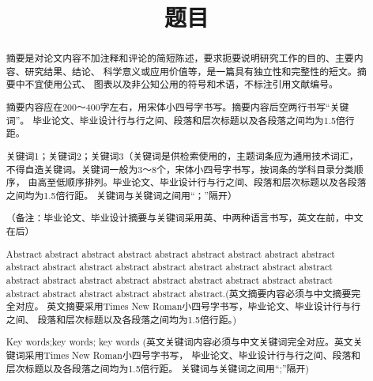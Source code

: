 \documentclass{sicnuthesis}
\title{题目}
\author{}
\date{}
\begin{document}
\maketitle

\newpage

\begin{abstract}


摘要是对论文内容不加注释和评论的简短陈述，要求扼要说明研究工作的目的、主要内容、研究结果、结论、
科学意义或应用价值等，是一篇具有独立性和完整性的短文。摘要中不宜使用公式、
图表以及非公知公用的符号和术语，不标注引用文献编号。

摘要内容应在200～400字左右，用宋体小四号字书写。摘要内容后空两行书写“关键词”。
毕业论文、毕业设计行与行之间、段落和层次标题以及各段落之间均为1.5倍行距。


关键词1；关键词2；关键词3（关键词是供检索使用的，主题词条应为通用技术词汇，
不得自造关键词。关键词一般为3～8个，宋体小四号字书写，按词条的学科目录分类顺序，
由高至低顺序排列。毕业论文、毕业设计行与行之间、段落和层次标题以及各段落之间均为1.5倍行距。
关键词与关键词之间用“；”隔开）

（备注：毕业论文、毕业设计摘要与关键词采用英、中两种语言书写，英文在前，中文在后）

\end{abstract}

\newpage

\renewcommand{\abstractname}{abstract} %

\begin{abstract}

Abstract abstract abstract abstract abstract abstract abstract abstract abstract abstract 
abstract abstract abstract abstract abstract abstract abstract abstract abstract abstract 
abstract abstract abstract abstract abstract abstract abstract abstract abstract abstract 
abstract abstract abstract.(英文摘要内容必须与中文摘要完全对应。
英文摘要采用Times New Roman小四号字书写，毕业论文、毕业设计行与行之间、
段落和层次标题以及各段落之间均为1.5倍行距。)


Key words;key words; key words
(英文关键词内容必须与中文关键词完全对应。英文关键词采用Times New Roman小四号字书写，
毕业论文、毕业设计行与行之间、段落和层次标题以及各段落之间均为1.5倍行距。
关键词与关键词之间用“;”隔开)
\end{abstract}

\newpage
\end{document}

